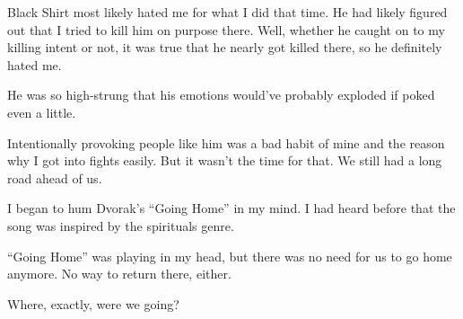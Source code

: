 Black Shirt most likely hated me for what I did that time. He had likely figured out that I tried to kill him on purpose there. Well, whether he caught on to my killing intent or not, it was true that he nearly got killed there, so he definitely hated me.

He was so high-strung that his emotions would've probably exploded if poked even a little.

Intentionally provoking people like him was a bad habit of mine and the reason why I got into fights easily. But it wasn't the time for that. We still had a long road ahead of us.

I began to hum Dvorak's ``Going Home'' in my mind. I had heard before that the song was inspired by the spirituals genre.

``Going Home'' was playing in my head, but there was no need for us to go home anymore. No way to return there, either.

Where, exactly, were we going?
